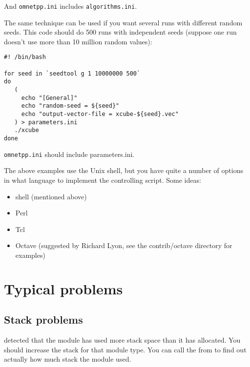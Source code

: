 And \texttt{omnetpp.ini} includes \texttt{algorithms.ini}.




The same technique can be used if you want several runs with different
random seeds. This code should do 500 runs with
independent seeds (suppose one run doesn't use more than 10 million
random values):

\begin{verbatim}
#! /bin/bash

for seed in `seedtool g 1 10000000 500`
do
   (
     echo "[General]"
     echo "random-seed = ${seed}"
     echo "output-vector-file = xcube-${seed}.vec"
   ) > parameters.ini
   ./xcube
done
\end{verbatim}


\texttt{omnetpp.ini} should include parameters.ini.




The above examples use the Unix shell, but you have quite a number
of options in what language to implement the controlling script.
Some ideas:
\begin{itemize}
  \item{shell (mentioned above)}
  \item{Perl}
  \item{Tcl}
  \item{Octave (suggested by Richard Lyon, see the contrib/octave
    directory for examples)}
\end{itemize}


\section{Typical problems}

\subsection{Stack problems}


{\opp} detected that the module has used more stack space than it has
allocated. You should increase the stack for that module type. You can call
the  from  to find out actually
how much stack the module used.


